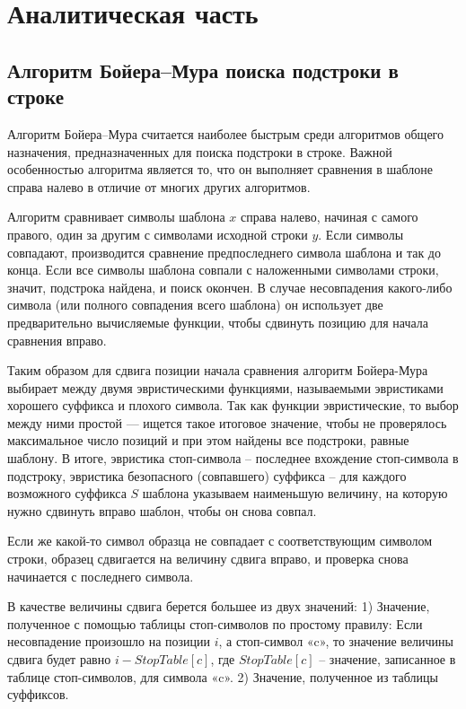 \chapter{Аналитическая часть}
\section{Алгоритм Бойера--Мура поиска подстроки в строке}

Алгоритм Бойера--Мура считается наиболее быстрым среди алгоритмов общего назначения, предназначенных для поиска подстроки в строке. Важной особенностью алгоритма является то, что он выполняет сравнения в шаблоне справа налево в отличие от многих других алгоритмов.


Алгоритм сравнивает символы шаблона $x$ справа налево, начиная с самого правого, один за другим с символами исходной строки $y$.
Если символы совпадают, производится сравнение предпоследнего символа шаблона и так до конца.
Если все символы шаблона совпали с наложенными символами строки, значит, подстрока найдена, и поиск окончен.
В случае несовпадения какого-либо символа (или полного совпадения всего шаблона) он использует две предварительно вычисляемые функции, чтобы сдвинуть позицию для начала сравнения вправо.


Таким образом для сдвига позиции начала сравнения алгоритм Бойера-Мура выбирает между двумя эвристическими функциями, называемыми эвристиками хорошего суффикса и плохого символа. Так как функции эвристические, то выбор между ними простой — ищется такое итоговое значение, чтобы не проверялось максимальное число позиций и при этом найдены все подстроки, равные шаблону. В итоге, эвристика стоп-символа -- последнее вхождение стоп-символа в подстроку, эвристика безопасного (совпавшего) суффикса -- для каждого возможного суффикса $S$ шаблона указываем наименьшую величину, на которую нужно сдвинуть вправо шаблон, чтобы он снова совпал.


Если же какой-то символ образца не совпадает с соответствующим символом строки, образец сдвигается на величину сдвига вправо, и проверка снова начинается с последнего символа.


В качестве величины сдвига берется большее из двух значений:
1) Значение, полученное с помощью таблицы стоп-символов по простому правилу:
Если несовпадение произошло на позиции $i$, а стоп-символ «c», то значение величины сдвига будет равно $i - StopTable[c]$, где 
$StopTable[c]$ -- значение, записанное в таблице стоп-символов, для символа «c».
2) Значение, полученное из таблицы суффиксов.

